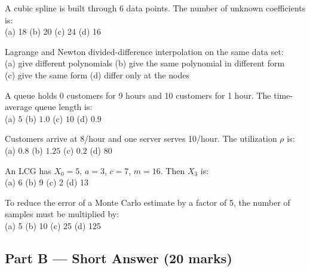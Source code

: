 \begin{mcqbox}
\mq A cubic spline is built through 6 data points. The number of unknown coefficients is:\\
(a) 18 \quad (b) 20 \quad (c) 24 \quad (d) 16

\mq Lagrange and Newton divided-difference interpolation on the same data set:\\
(a) give different polynomials \quad (b) give the same polynomial in different form \\
(c) give the same form \quad (d) differ only at the nodes

\mq A queue holds 0 customers for 9 hours and 10 customers for 1 hour. The time-average queue length is:\\
(a) $5$ \quad (b) $1.0$ \quad (c) $10$ \quad (d) $0.9$

\mq Customers arrive at 8/hour and one server serves 10/hour. The utilization $\rho$ is:\\
(a) $0.8$ \quad (b) $1.25$ \quad (c) $0.2$ \quad (d) $80$

\mq An LCG has $X_0 = 5$, $a = 3$, $c = 7$, $m = 16$. Then $X_3$ is:\\
(a) 6 \quad (b) 9 \quad (c) 2 \quad (d) 13

\mq To reduce the error of a Monte Carlo estimate by a factor of 5, the number of samples must be multiplied by:\\
(a) 5 \quad (b) 10 \quad (c) 25 \quad (d) 125
\end{mcqbox}

\subsection{Part B --- Short Answer (20 marks)}

